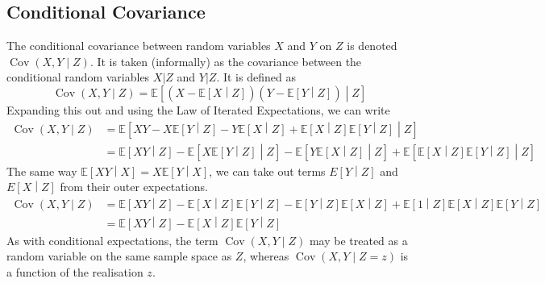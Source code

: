 \documentclass[11pt]{report} %
\begin{document}
\subsection{Conditional Covariance}

The conditional covariance between random variables $X$ and $Y$ on $Z$ is denoted $\operatorname{Cov}\left(X, Y\middle| Z\right)$. It is taken (informally) as the covariance between the conditional random variables $X|Z$ and $Y|Z$. It is defined as
\begin{equation}
\operatorname{Cov}\left(X, Y\middle| Z\right) = \mathbb{E}\left[\left(X - \mathbb{E}\left[X\middle| Z\right]\right)\left(Y - \mathbb{E}\left[Y\middle| Z\right]\right)\middle|Z\right]
\end{equation}
Expanding this out and using the Law of Iterated Expectations, we can write
\begin{align}
\operatorname{Cov}\left(X, Y\middle| Z\right) &= \mathbb{E}\left[XY - X\mathbb{E}\left[Y\middle|Z\right] - Y\mathbb{E}\left[X\middle|Z\right] + \mathbb{E}\left[X\middle| Z\right]\mathbb{E}\left[Y\middle| Z\right]\middle|Z\right] \\
&= \mathbb{E}\left[XY\middle|Z\right] - \mathbb{E}\left[X\mathbb{E}\left[Y\middle|Z\right]\middle|Z\right] - \mathbb{E}\left[Y\mathbb{E}\left[X\middle|Z\right]\middle|Z\right] +\mathbb{E}\left[\mathbb{E}\left[X\middle| Z\right]\mathbb{E}\left[Y\middle| Z\right]\middle|Z\right]
\end{align}
The same way $\mathbb{E}\left[XY\middle|X\right] = X\mathbb{E}\left[Y\middle|X\right]$, we can take out terms ${E}\left[Y\middle|Z\right]$ and ${E}\left[X\middle|Z\right]$ from their outer expectations.
\begin{align}
\operatorname{Cov}\left(X, Y\middle| Z\right) &= \mathbb{E}\left[XY\middle|Z\right] - \mathbb{E}\left[X\middle|Z\right]\mathbb{E}\left[Y\middle|Z\right] - \mathbb{E}\left[Y\middle|Z\right]\mathbb{E}\left[X\middle|Z\right] +\mathbb{E}\left[1\middle|Z\right]\mathbb{E}\left[X\middle| Z\right]\mathbb{E}\left[Y\middle| Z\right] \\
 &= \mathbb{E}\left[XY\middle|Z\right] - \mathbb{E}\left[X\middle|Z\right]\mathbb{E}\left[Y\middle|Z\right]
\end{align}
As with conditional expectations, the term $\operatorname{Cov}\left(X, Y\middle| Z\right)$ may be treated as a random variable on the same sample space as $Z$, whereas $\operatorname{Cov}\left(X, Y\middle| Z = z\right)$ is a function of the realisation $z$.
\end{document}
